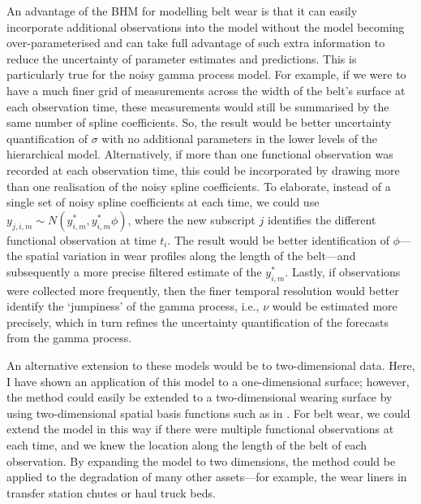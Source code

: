 An advantage of the BHM for modelling belt wear is that it can easily incorporate additional observations into the model without the model becoming over-parameterised and can take full advantage of such extra information to reduce the uncertainty of parameter estimates and predictions. This is particularly true for the noisy gamma process model. For example, if we were to have a much finer grid of measurements across the width of the belt's surface at each observation time, these measurements would still be summarised by the same number of spline coefficients. So, the result would be better uncertainty quantification of $\sigma$ with no additional parameters in the lower levels of the hierarchical model. Alternatively, if more than one functional observation was recorded at each observation time, this could be incorporated by drawing more than one realisation of the noisy spline coefficients. To elaborate, instead of a single set of noisy spline coefficients at each time, we could use $y_{j, i, m} \sim N(y^*_{i, m}, y^*_{i, m}\phi)$, where the new subscript $j$ identifies the different functional observation at time $t_i$. The result would be better identification of $\phi$---the spatial variation in wear profiles along the length of the belt---and subsequently a more precise filtered estimate of the $y^*_{i, m}$. Lastly, if observations were collected more frequently, then the finer temporal resolution would better identify the `jumpiness' of the gamma process, i.e., $\nu$ would be estimated more precisely, which in turn refines the uncertainty quantification of the forecasts from the gamma process. 

An alternative extension to these models would be to two-dimensional data. Here, I have shown an application of this model to a one-dimensional surface; however, the method could easily be extended to a two-dimensional wearing surface by using two-dimensional spatial basis functions such as in \citet[p.~84]{wikle_2019}. For belt wear, we could extend the model in this way if there were multiple functional observations at each time, and we knew the location along the length of the belt of each observation. By expanding the model to two dimensions, the method could be applied to the degradation of many other assets---for example, the wear liners in transfer station chutes or haul truck beds.

